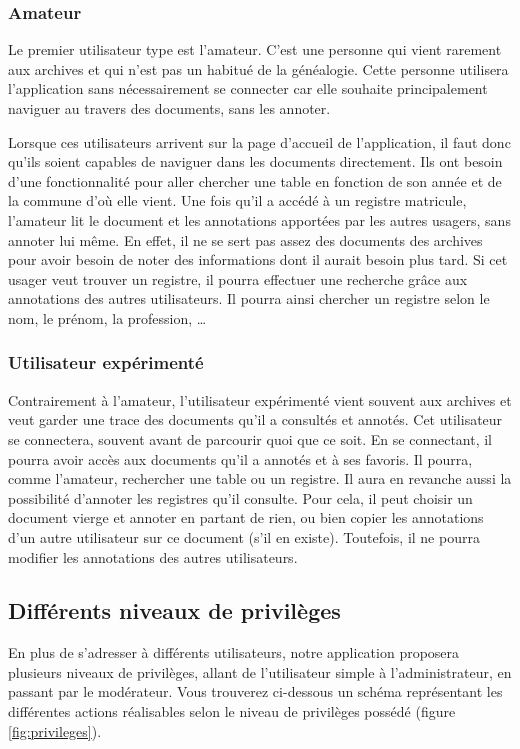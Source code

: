 \documentclass[a4paper]{article}
\begin{document}
\subsubsection{Amateur}
Le premier utilisateur type est l'amateur. C'est une personne qui vient rarement aux archives et qui n'est pas un habitué de la généalogie. Cette personne utilisera l'application sans nécessairement se connecter car elle souhaite principalement naviguer au travers des documents, sans les annoter.

Lorsque ces utilisateurs arrivent sur la page d'accueil de l'application, il faut donc qu'ils soient capables de naviguer dans les documents directement. Ils ont besoin d'une fonctionnalité pour aller chercher une table en fonction de son année et de la commune d'où elle vient. Une fois qu'il a accédé à un registre matricule, l'amateur lit le document et les annotations apportées par les autres usagers, sans annoter lui même. En effet, il ne se sert pas assez des documents des archives pour avoir besoin de noter des informations dont il aurait besoin plus tard. Si cet usager veut trouver un registre, il pourra effectuer une recherche grâce aux annotations des autres utilisateurs. Il pourra ainsi chercher un registre selon le nom, le prénom, la profession, \ldots

\subsubsection{Utilisateur expérimenté}
Contrairement à l'amateur, l'utilisateur expérimenté vient souvent aux archives et veut garder une trace des documents qu'il a consultés et annotés. Cet utilisateur se connectera, souvent avant de parcourir quoi que ce soit. En se connectant, il pourra avoir accès aux documents qu'il a annotés et à ses favoris. Il pourra, comme l'amateur, rechercher une table ou un registre. Il aura en revanche aussi la possibilité d'annoter les registres qu'il consulte. Pour cela, il peut choisir un document vierge et annoter en partant de rien, ou bien copier les annotations d'un autre utilisateur sur ce document (s'il en existe). Toutefois, il ne pourra modifier les annotations des autres utilisateurs.

\subsection{Différents niveaux de privilèges}
En plus de s'adresser à différents utilisateurs, notre application proposera plusieurs niveaux de privilèges, allant de l'utilisateur simple à l'administrateur, en passant par le modérateur. Vous trouverez ci-dessous un schéma représentant les différentes actions réalisables selon le niveau de privilèges possédé (figure \ref{fig:privileges}).
\end{document}
